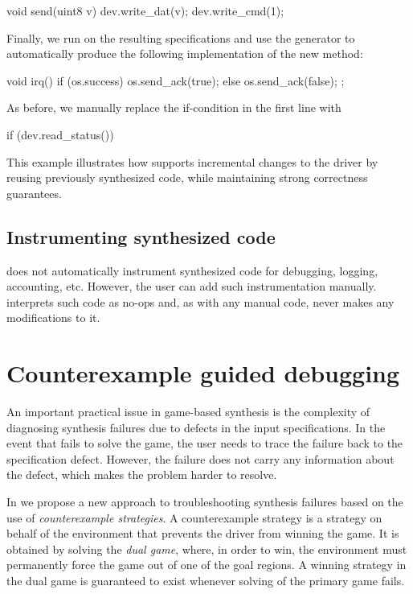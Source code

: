 \begin{tsllisting}[keywords=, frame=single]
void send(uint8 v){
    dev.write_dat(v);
    dev.write_cmd(1);}
\end{tsllisting}

Finally, we run \termite on the resulting specifications and use the generator to automatically produce the following implementation of the new  method:

\begin{tsllisting}[keywords=, frame=single]
void irq(){
    if (os.success) {
        os.send_ack(true);
    } else {
        os.send_ack(false);
    };}
\end{tsllisting}

As before, we manually replace the if-condition in the first line with

\begin{tsllisting}[keywords=, frame=single]
if (dev.read_status())
\end{tsllisting}

This example illustrates how \termite supports incremental changes to the driver by reusing previously synthesized code, while maintaining strong correctness guarantees.

\subsection{Instrumenting synthesized code~~} 
\termite does not automatically instrument synthesized code for debugging, logging, accounting, etc.  However, the user can add such instrumentation manually.  \termite interprets such code as no-ops and, as with any manual code, never makes any modifications to it.

\section{Counterexample guided debugging}

An important practical issue in game-based synthesis is the complexity of diagnosing synthesis failures due to defects in the input specifications.  In the event that \termite fails to solve the game, the user needs to trace the failure back to the specification defect.  However, the failure does not carry any information about the defect, which makes the problem harder to resolve.

In \termite we propose a new approach to troubleshooting synthesis failures based on the use of \emph{counterexample strategies}.  A counterexample strategy is a strategy on behalf of the environment that prevents the driver from winning the game.  It is obtained by solving the \emph{dual game}, where, in order to win, the environment must permanently force the game out of one of the goal regions.  A winning strategy in the dual game is guaranteed to exist whenever solving of the primary game fails.

